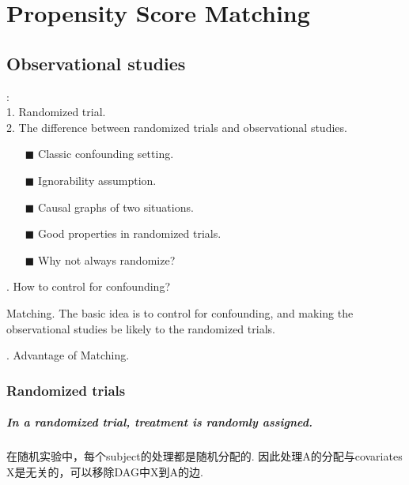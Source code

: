 \chapter{Propensity Score Matching}

\section{Observational studies}
:\\
1. Randomized trial.\\
2. The difference between randomized trials and observational studies.
\begin{itemize}
	\item[$\blacksquare$] Classic confounding setting.
	\item[$\blacksquare$] Ignorability assumption.
	\item[$\blacksquare$] Causal graphs of two situations.
	\item[$\blacksquare$] Good properties in randomized trials.
	\item[$\blacksquare$] Why not always randomize?
\end{itemize}

. How to control for confounding?

Matching. {\color{orange}The basic idea} is to control for confounding, and making the observational studies be likely to the randomized trials.

. Advantage of Matching.

\subsection{Randomized trials}
\paragraph{In a randomized trial, treatment is randomly assigned.} 在随机实验中，每个subject的处理都是随机分配的. 因此处理A的分配与covariates X是无关的，可以移除DAG中X到A的边. 

